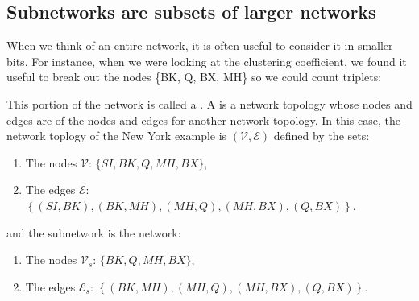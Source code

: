 \documentclass[letterpaper,10pt,english]{jupyterBook}
\begin{document}
\subsection{Subnetworks are subsets of larger networks}
\label{\detokenize{representations/ch4/properties-of-networks:subnetworks-are-subsets-of-larger-networks}}
\sphinxAtStartPar
When we think of an entire network, it is often useful to consider it in smaller bits. For instance, when we were looking at the clustering coefficient, we found it useful to break out the nodes \{BK, Q, BX, MH\} so we could count triplets:

\noindent{}

\sphinxAtStartPar
This portion of the network is called a . A  is a network topology whose nodes and edges are  of the nodes and edges for another network topology. In this case, the  network toplogy of the New York example is \((\mathcal V, \mathcal E)\) defined by the sets:
\begin{enumerate}
%
\item {} 
\sphinxAtStartPar
The nodes \(\mathcal V\): \(\{SI, BK, Q, MH, BX\}\),

\item {} 
\sphinxAtStartPar
The edges \(\mathcal E\): \(\left\{(SI, BK), (BK, MH), (MH, Q), (MH, BX), (Q, BX)\right\}\).

\end{enumerate}

\sphinxAtStartPar
and the subnetwork is the network:
\begin{enumerate}
%
\item {} 
\sphinxAtStartPar
The nodes \(\mathcal V_s\): \(\{BK, Q, MH, BX\}\),

\item {} 
\sphinxAtStartPar
The edges \(\mathcal E_s\): \(\left\{(BK, MH), (MH, Q), (MH, BX), (Q, BX)\right\}\).

\end{enumerate}
\end{document}
